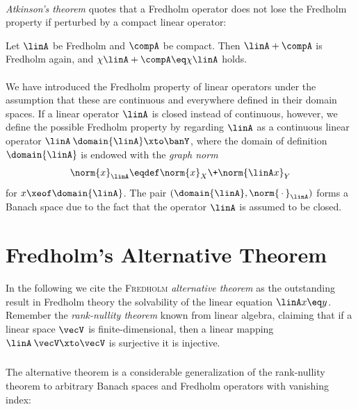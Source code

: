 \documentclass[11pt,twoside]{article}
\begin{document}
\paragraph{} %
\textit{Atkinson's theorem} quotes that a Fredholm operator does not lose
the Fredholm property if perturbed by a compact linear operator:

\begin{theorem1}\label{ATKINSON_THEOREM}
Let $\linA$ be Fredholm and $\compA$ be compact.
Then $\linA + \compA$ is Fredholm again, and
$\chi{\linA+\compA} \eq \chi{\linA}$ holds.
\end{theorem1}

\paragraph{} %
We have introduced the Fredholm property of linear operators
under the assumption that
these are continuous and everywhere defined in their domain spaces.
If a linear operator $\linA$ is closed instead of continuous,
however,
we define the possible Fredholm property by regarding
$\linA$ as a continuous linear operator $\linA \: \domain{\linA} \xto \banY$,
where the domain of definition $\domain{\linA}$ is endowed
with the \textit{graph norm}
\[
\norm{x}_{\linA} \eqdef \norm{x}_X \+ \norm{\linA x}_Y
\]
for $x \xeof \domain{\linA}$.
The pair $(\domain{\linA},\norm{\,\cdot\,}_{\linA})$
forms a Banach space due to the fact that
the operator $\linA$ is assumed to be closed.

\section{Fredholm's Alternative Theorem}
In the following we cite the \textsc{Fredholm} \textit{alternative theorem}
as the outstanding result in Fredholm theory
{\wrt} the solvability of the linear equation $\linA x \eq y$.
Remember the \textit{rank-nullity theorem} known from linear algebra,
claiming that if a linear space $\vecV$ is finite-dimensional,
then a linear mapping $\linA \: \vecV \xto \vecV$ is surjective
\iff it is injective.

\subparagraph{}
The alternative theorem is a considerable generalization
of the rank-nullity theorem to arbitrary Banach spaces and Fredholm operators
with vanishing index:
\end{document}
